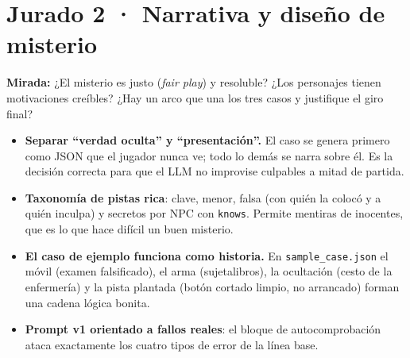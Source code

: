 \documentclass[11pt,a4paper]{article}
\newcommand{\file}[1]{\texttt{\small #1}}
\begin{document}
\section{Jurado 2 · Narrativa y diseño de misterio}

\begin{perfil}
\textbf{Mirada:} ¿El misterio es justo (\emph{fair play}) y resoluble? ¿Los personajes tienen
motivaciones creíbles? ¿Hay un arco que una los tres casos y justifique el giro final?
\end{perfil}

\begin{fuerte}
\begin{itemize}
\item \textbf{Separar ``verdad oculta'' y ``presentación''.} El caso se genera primero como JSON que
el jugador nunca ve; todo lo demás se narra sobre él. Es la decisión correcta para que el LLM no
improvise culpables a mitad de partida.
\item \textbf{Taxonomía de pistas rica}: clave, menor, falsa (con quién la colocó y a quién inculpa)
y secretos por NPC con \texttt{knows}. Permite mentiras de inocentes, que es lo que hace difícil un
buen misterio.
\item \textbf{El caso de ejemplo funciona como historia.} En \file{sample\_case.json} el móvil
(examen falsificado), el arma (sujetalibros), la ocultación (cesto de la enfermería) y la pista
plantada (botón cortado limpio, no arrancado) forman una cadena lógica bonita.
\item \textbf{Prompt v1 orientado a fallos reales}: el bloque de autocomprobación ataca exactamente
los cuatro tipos de error de la línea base.
\end{itemize}
\end{fuerte}
\end{document}
